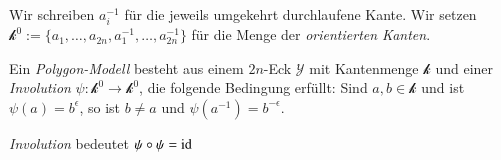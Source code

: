 \documentclass[a4paper,10pt]{scrartcl}
\begin{document}
\begin{figure}[H]
 \centering
\fixme[fig135]
\caption{}
\end{figure}

Wir schreiben $a_i^{-1}$ für die jeweils umgekehrt durchlaufene Kante. Wir setzen $\mathcal k^0:=\{a_1,\dotsc, a_{2n}, a_1^{-1},\dotsc , a_{2n}^{-1}\}$ für die Menge der \emph{orientierten Kanten}.

\begin{df}
 Ein \emph{Polygon-Modell} besteht aus einem $2n$-Eck $\mathcal Y$ mit Kantenmenge $\mathcal k$ und einer \emph{Involution} $\psi: \mathcal k^0 \to \mathcal k^0$, die folgende Bedingung erfüllt: Sind $a,b\in \mathcal k$ und ist $\psi(a)=b^{\epsilon}$, so ist $b\neq a$ und $\psi(a^{-1})=b^{-\epsilon}$.
\end{df}
\begin{note*}
 \emph{Involution} bedeutet $\psi\circ \psi=\operatorname{id}$
\end{note*}
\end{document}
